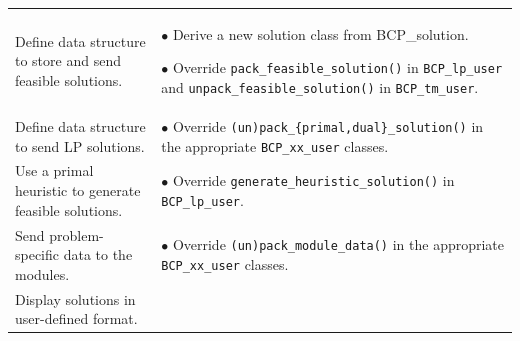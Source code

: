 {\begin{longtable}{|p{2in}|p{3.65in}|}
\begin{minipage}[t]{3.65in}
\end{minipage}\\

\hline

Define data structure to store and send feasible solutions. & 

\begin{minipage}[t]{3.65in}

$\bullet$ Derive a new solution class from {BCP\_solution}.

$\bullet$ Override {\tt pack\_feasible\_solution()} in {\tt BCP\_lp\_user} and
{\tt unpack\_feasible\_solution()} in {\tt BCP\_tm\_user}. 

\end{minipage}\\

\hline

Define data structure to send LP solutions. & 

\begin{minipage}[t]{3.65in}

$\bullet$ Override {\tt (un)pack\_\{primal,dual\}\_solution()}
in the appropriate {\tt BCP\_xx\_user} classes.

\end{minipage}\\

\hline

Use a primal heuristic to generate feasible solutions. & 

\begin{minipage}[t]{3.65in}

$\bullet$ Override {\tt generate\_heuristic\_solution()} in 
{\tt BCP\_lp\_user}.

\end{minipage}\\

\hline

Send problem-specific data to the modules.  & 

\begin{minipage}[t]{3.65in}

$\bullet$ Override {\tt (un)pack\_module\_data()} in the appropriate 
{\tt BCP\_xx\_user} classes.

\end{minipage}\\

\hline

Display solutions in user-de\-fi\-ned format. & 

\begin{minipage}[t]{3.65in}


\end{minipage}
\end{longtable}}
